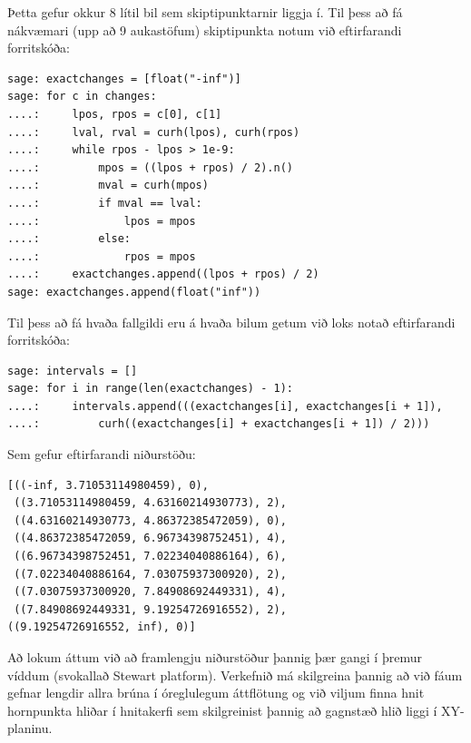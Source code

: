 \documentclass{article}
\begin{document}
\vspace*{0.5cm}

Þetta gefur okkur 8 lítil bil sem skiptipunktarnir liggja í. Til þess að fá nákvæmari (upp að 9 aukastöfum) skiptipunkta notum við eftirfarandi forritskóða: \\

\begin{verbatim}
sage: exactchanges = [float("-inf")]
sage: for c in changes:
....:     lpos, rpos = c[0], c[1]
....:     lval, rval = curh(lpos), curh(rpos)
....:     while rpos - lpos > 1e-9:
....:         mpos = ((lpos + rpos) / 2).n()
....:         mval = curh(mpos)
....:         if mval == lval:
....:             lpos = mpos
....:         else:
....:             rpos = mpos
....:     exactchanges.append((lpos + rpos) / 2)
sage: exactchanges.append(float("inf"))
\end{verbatim}

\vspace*{0.5cm}

Til þess að fá hvaða fallgildi eru á hvaða bilum getum við loks notað eftirfarandi forritskóða: \\

\begin{verbatim}
sage: intervals = []
sage: for i in range(len(exactchanges) - 1):
....:     intervals.append(((exactchanges[i], exactchanges[i + 1]), 
....:         curh((exactchanges[i] + exactchanges[i + 1]) / 2)))
\end{verbatim}

\vspace*{0.5cm}

Sem gefur eftirfarandi niðurstöðu: \\

\begin{verbatim}
[((-inf, 3.71053114980459), 0),
 ((3.71053114980459, 4.63160214930773), 2),
 ((4.63160214930773, 4.86372385472059), 0),
 ((4.86372385472059, 6.96734398752451), 4),
 ((6.96734398752451, 7.02234040886164), 6),
 ((7.02234040886164, 7.03075937300920), 2),
 ((7.03075937300920, 7.84908692449331), 4),
 ((7.84908692449331, 9.19254726916552), 2),
((9.19254726916552, inf), 0)]
\end{verbatim}

\vspace*{0.5cm}

Að lokum áttum við að framlengju niðurstöður þannig þær gangi í þremur víddum
(svokallað Stewart platform). Verkefnið má skilgreina þannig að við fáum gefnar
lengdir allra brúna í óreglulegum áttflötung og við viljum finna hnit hornpunkta
hliðar í hnitakerfi sem skilgreinist þannig að gagnstæð hlið liggi í XY-planinu.
\end{document}
